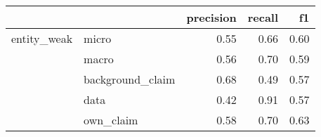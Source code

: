 \begin{tabular}{llrrr}
\toprule
            &           &  precision &  recall &   f1 \\
\midrule
entity\_weak & micro &       0.55 &    0.66 & 0.60 \\
            & macro &       0.56 &    0.70 & 0.59 \\
            & background\_claim &       0.68 &    0.49 & 0.57 \\
            & data &       0.42 &    0.91 & 0.57 \\
            & own\_claim &       0.58 &    0.70 & 0.63 \\
\bottomrule
\end{tabular}
